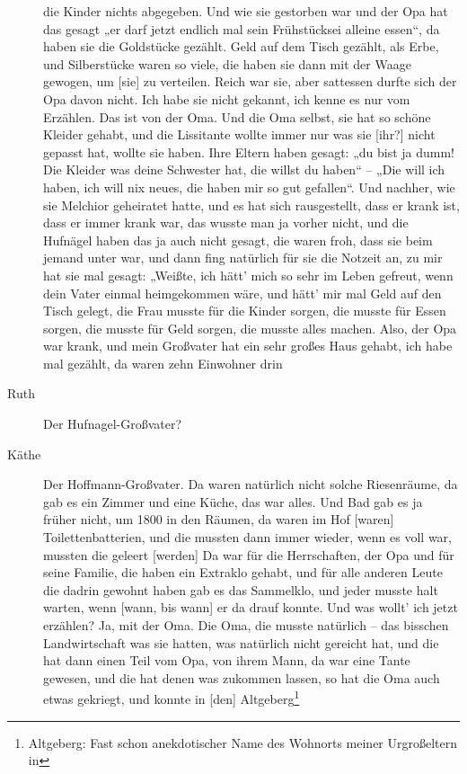 \documentclass[ngerman,]{article}
\begin{document}
\begin{multicols}{2}
\begin{description}
die Kinder nichts abgegeben. Und wie sie gestorben war und der Opa hat
das gesagt „er darf jetzt endlich mal sein Frühstücksei alleine essen“,
da haben sie die Goldstücke gezählt. Geld auf dem Tisch gezählt, als
Erbe, und Silberstücke waren so viele, die haben sie dann mit der Waage
gewogen, um {[}sie{]} zu verteilen. Reich war sie, aber sattessen durfte
sich der Opa davon nicht. Ich habe sie nicht gekannt, ich kenne es nur
vom Erzählen. Das ist von der Oma. Und die Oma selbst, sie hat so schöne
Kleider gehabt, und die Lissitante wollte immer nur was sie {[}ihr?{]}
nicht gepasst hat, wollte sie haben. Ihre Eltern haben gesagt: „du bist
ja dumm! Die Kleider was deine Schwester hat, die willst du haben“ –
„Die will ich haben, ich will nix neues, die haben mir so gut gefallen“.
Und nachher, wie sie Melchior geheiratet hatte, und es hat sich
rausgestellt, dass er krank ist, dass er immer krank war, das wusste man
ja vorher nicht, und die Hufnägel haben das ja auch nicht gesagt, die
waren froh, dass sie beim jemand unter war, und dann fing natürlich für
sie die Notzeit an, zu mir hat sie mal gesagt: „Weißte, ich hätt' mich
so sehr im Leben gefreut, wenn dein Vater einmal heimgekommen wäre, und
hätt' mir mal Geld auf den Tisch gelegt, die Frau musste für die Kinder
sorgen, die musste für Essen sorgen, die musste für Geld sorgen, die
musste alles machen. Also, der Opa war krank, und mein Großvater hat ein
sehr großes Haus gehabt, ich habe mal gezählt, da waren zehn Einwohner
drin
\item[Ruth]
Der Hufnagel-Großvater?
\item[Käthe]
Der Hoffmann-Großvater. Da waren natürlich nicht solche Riesenräume, da
gab es ein Zimmer und eine Küche, das war alles. Und Bad gab es ja
früher nicht, um 1800 in den Räumen, da waren im Hof {[}waren{]}
Toilettenbatterien, und die mussten dann immer wieder, wenn es voll war,
mussten die geleert {[}werden{]} Da war für die Herrschaften, der Opa
und für seine Familie, die haben ein Extraklo gehabt, und für alle
anderen Leute die dadrin gewohnt haben gab es das Sammelklo, und jeder
musste halt warten, wenn {[}wann, bis wann{]} er da drauf konnte. Und
was wollt' ich jetzt erzählen? Ja, mit der Oma. Die Oma, die musste
natürlich – das bisschen Landwirtschaft was sie hatten, was natürlich
nicht gereicht hat, und die hat dann einen Teil vom Opa, von ihrem Mann,
da war eine Tante gewesen, und die hat denen was zukommen lassen, so hat
die Oma auch etwas gekriegt, und konnte in {[}den{]} Altgeberg\footnote{Altgeberg:
  Fast schon anekdotischer Name des Wohnorts meiner Urgroßeltern in
}
\end{description}
\end{multicols}
\end{document}
